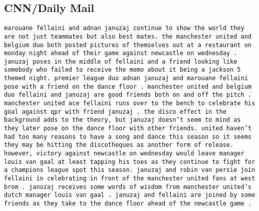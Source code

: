 \documentclass[twoside,11pt]{article}
\begin{document}
\subsection{CNN/Daily Mail}
\begin{description}[leftmargin=0.5cm]
\item[Original input:] \texttt{marouane fellaini and adnan januzaj continue to show the world they are not just teammates but also best mates. the manchester united and belgium duo both posted pictures of themselves out at a restaurant on monday night ahead of their game against newcastle on wednesday . januzaj poses in the middle of fellaini and a friend looking like somebody who failed to receive the memo about it being a jackson 5 themed night. premier league duo adnan januzaj and marouane fellaini pose with a friend on the dance floor . manchester united and belgium duo fellaini and januzaj are good friends both on and off the pitch . manchester united ace fellaini runs over to the bench to celebrate his goal against qpr with friend januzaj . the disco effect in the background adds to the theory, but januzaj doesn’t seem to mind as they later pose on the dance floor with other friends. united haven’t had too many reasons to have a song and dance this season so it seems they may be hitting the discotheques as another form of release. however, victory against newcastle on wednesday would leave manager louis van gaal at least tapping his toes as they continue to fight for a champions league spot this season. januzaj and robin van persie join fellaini in celebrating in front of the manchester united fans at west brom . januzaj receives some words of wisdom from manchester united's dutch manager louis van gaal . januzaj and fellaini are joined by some friends as they take to the dance floor ahead of the newcastle game .}

\end{description}
\end{document}
